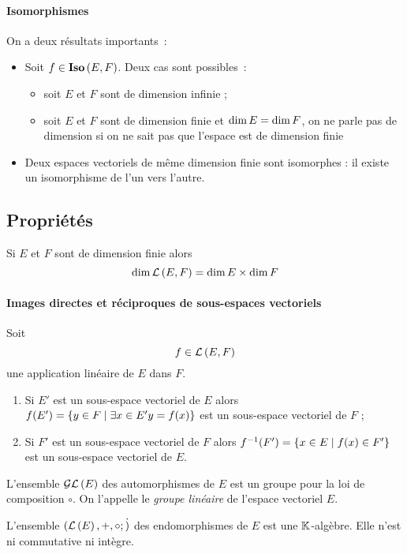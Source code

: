 \paragraph{Isomorphismes} 
On a deux résultats importants~: 
\begin{itemize} 
    \item Soit $f \in \mathbf{Iso}\left(E,F\right)$. Deux cas sont possibles~: 
    \begin{itemize} 
        \item soit $E$ et $F$ sont de dimension infinie ; 
        \item soit $E$ et $F$ sont de dimension finie et $\operatorname{dim}{E} = \operatorname{dim}{F}$, on
            ne parle pas de dimension si on ne sait pas que l'espace est de
            dimension finie
    \end{itemize} 
    \item Deux espaces vectoriels de même dimension finie sont isomorphes : il
        existe un isomorphisme de l'un vers l'autre.
\end{itemize}

\subsection{Propriétés} 
\begin{prop} 
    Si $E$ et $F$ sont de dimension finie alors
    \begin{equation}
        \operatorname{dim}\mathcal{L}\left(E,F\right)=\operatorname{dim}{E} \times \operatorname{dim}{F}
    \end{equation}
\end{prop}
%
\paragraph{Images directes et réciproques de sous-espaces vectoriels} 
\begin{prop}
    Soit \[f \in \mathcal{L}\left(E,F\right)\] une application linéaire de $E$ dans $F$.
    \begin{enumerate} 
        \item Si $E'$ est un sous-espace vectoriel de $E$ alors $f(E') =
        \left\{y \in F\mathrel{}\middle|\mathrel{}\exists x \in E' y=f(x)\right\}$ est un sous-espace vectoriel
            de $F$ ;
        \item Si $F'$ est un sous-espace vectoriel de $F$ alors $f^{-1}(F') =
            \left\{x \in E\mathrel{}\middle|\mathrel{}f(x) \in F'\right\}$ est un sous-espace vectoriel de $E$.
    \end{enumerate}
\end{prop}
%
\begin{prop} 
    L'ensemble $\mathcal{GL}\left(E\right)$ des automorphismes de $E$ est un groupe pour la loi de
    composition $\circ$. On l'appelle le \emph{groupe linéaire} de l'espace vectoriel $E$.  
\end{prop}
%
\begin{prop} 
    L'ensemble $(\mathcal{L}\left(E\right),+,\circ;\dot)$ des endomorphismes de $E$ est une
    $\mathbb{K}$-algèbre. Elle n'est ni commutative ni intègre.
\end{prop}
